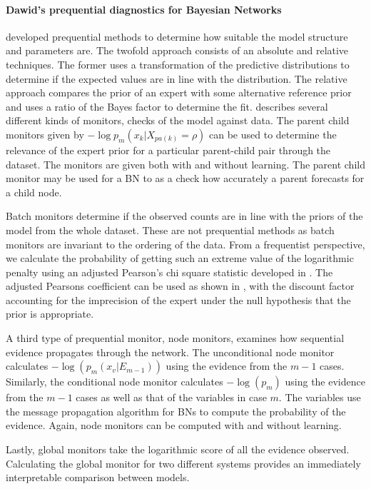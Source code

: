 \documentclass[12pt]{article}
\begin{document}
\paragraph{Dawid's prequential diagnostics for Bayesian Networks}
\cite{DAWID} developed prequential methods to determine how suitable the model structure and parameters are.  
The twofold approach consists of an absolute and relative techniques. The former uses a transformation of the predictive distributions to determine if the expected values are in line with the distribution. The relative approach compares the prior of an expert with some alternative reference prior and uses a ratio of the Bayes factor to determine the fit.
\cite{diagnostics} describes several different kinds of monitors, checks of the model against data. The parent child monitors given by $-\log p_m (x_k | X_{pa(k)}=\rho)$ can be used to determine the relevance of the expert prior for a particular parent-child pair through the dataset. The monitors are given both with and without learning. The parent child monitor may be used for a BN to as a check how accurately a parent forecasts for a child node. 

Batch monitors determine if the observed counts are in line with the priors of the model from the whole dataset. These are not prequential methods as batch monitors are invariant to the ordering of the data.   From a frequentist perspective, we calculate the probability of getting such an extreme value of the logarithmic penalty using an adjusted Pearson's chi square statistic developed in \cite{box} .  The adjusted Pearsons coefficient can be used as shown in \cite{Spiegelhalter1994}, with the discount factor accounting for the imprecision of the expert under the null hypothesis that the prior is appropriate. 

A third type of prequential monitor, node monitors, examines how sequential evidence propagates through the network. The unconditional node monitor calculates $-\log(p_m(x_v | E_{m-1}))$ using the evidence from the $m-1$ cases. Similarly, the conditional node monitor calculates $-\log(p_m)$ using the evidence from the $m-1$ cases as well as that of the variables in case $m$. The variables use the message propagation algorithm for BNs to compute the probability of the evidence. Again, node monitors can be computed with and without learning. 

Lastly, global monitors take the logarithmic score of all the evidence observed. Calculating the global monitor for two different systems provides an immediately interpretable comparison between models.
\end{document}
